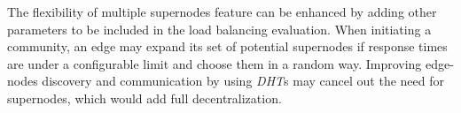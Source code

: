
The flexibility of multiple supernodes feature can be enhanced by adding other parameters to be included in the load balancing evaluation. When initiating a community, an edge may expand its set of potential supernodes if response times are under a configurable limit and choose them in a random way. Improving edge-nodes discovery and communication by using \emph{DHT}s may cancel out the need for supernodes, which would add full decentralization.
